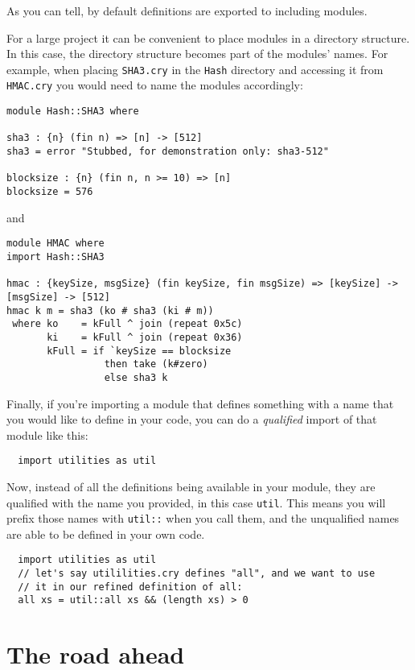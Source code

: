As you can tell, by default definitions are exported to including modules.

For a large project it can be convenient to place modules in a directory
structure.  In this case, the directory structure becomes part of the modules'
names.  For example, when placing \verb+SHA3.cry+ in the \verb+Hash+ directory and
accessing it from \verb+HMAC.cry+ you would need to name the modules
accordingly:

\begin{verbatim}
module Hash::SHA3 where

sha3 : {n} (fin n) => [n] -> [512]
sha3 = error "Stubbed, for demonstration only: sha3-512"

blocksize : {n} (fin n, n >= 10) => [n]
blocksize = 576
\end{verbatim}

and

\begin{verbatim}
module HMAC where
import Hash::SHA3

hmac : {keySize, msgSize} (fin keySize, fin msgSize) => [keySize] -> [msgSize] -> [512]
hmac k m = sha3 (ko # sha3 (ki # m))
 where ko    = kFull ^ join (repeat 0x5c)
       ki    = kFull ^ join (repeat 0x36)
       kFull = if `keySize == blocksize
                 then take (k#zero)
                 else sha3 k
\end{verbatim}

Finally, if you're importing a module that defines something with
a name that you would like to define in your code, you can do a
{\it qualified} import of that module like this:

\begin{verbatim}
  import utilities as util
\end{verbatim}

Now, instead of all the definitions being available in your module,
they are qualified with the name you provided, in this case \verb+util+.
This means you will prefix those names with \verb+util::+ when you call them,
and the unqualified names are able to be defined in your own code.

\begin{verbatim}
  import utilities as util
  // let's say utililities.cry defines "all", and we want to use
  // it in our refined definition of all:
  all xs = util::all xs && (length xs) > 0
\end{verbatim}

\section{The road ahead}
\label{sec:road-ahead}

